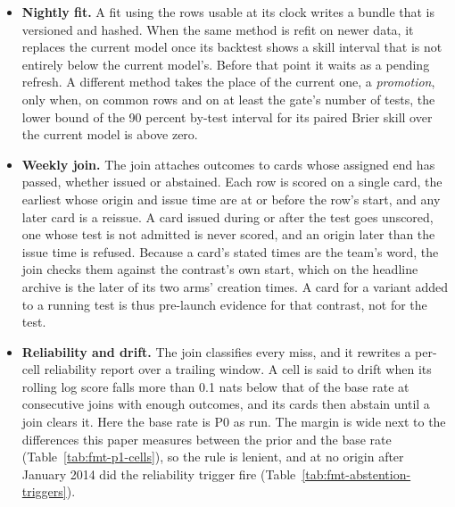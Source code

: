 \begin{itemize}
\item \textbf{Nightly fit.} A fit using the rows usable at its clock writes a bundle that is versioned and hashed. When the same method is refit on newer data, it replaces the current model once its backtest shows a skill interval that is not entirely below the current model's. Before that point it waits as a pending refresh. A different method takes the place of the current one, a \emph{promotion}, only when, on common rows and on at least the gate's number of tests, the lower bound of the 90 percent by-test interval for its paired Brier skill over the current model is above zero.
\item \textbf{Weekly join.} The join attaches outcomes to cards whose assigned end has passed, whether issued or abstained. Each row is scored on a single card, the earliest whose origin and issue time are at or before the row's start, and any later card is a reissue. A card issued during or after the test goes unscored, one whose test is not admitted is never scored, and an origin later than the issue time is refused. Because a card's stated times are the team's word, the join checks them against the contrast's own start, which on the headline archive is the later of its two arms' creation times. A card for a variant added to a running test is thus pre-launch evidence for that contrast, not for the test.
\item \textbf{Reliability and drift.} The join classifies every miss, and it rewrites a per-cell reliability report over a trailing window. A cell is said to drift when its rolling log score falls more than 0.1 nats below that of the base rate at consecutive joins with enough outcomes, and its cards then abstain until a join clears it. Here the base rate is P0 as run. The margin is wide next to the differences this paper measures between the prior and the base rate (Table~\ref{tab:fmt-p1-cells}), so the rule is lenient, and at no origin after January 2014 did the reliability trigger fire (Table~\ref{tab:fmt-abstention-triggers}).

\end{itemize}

